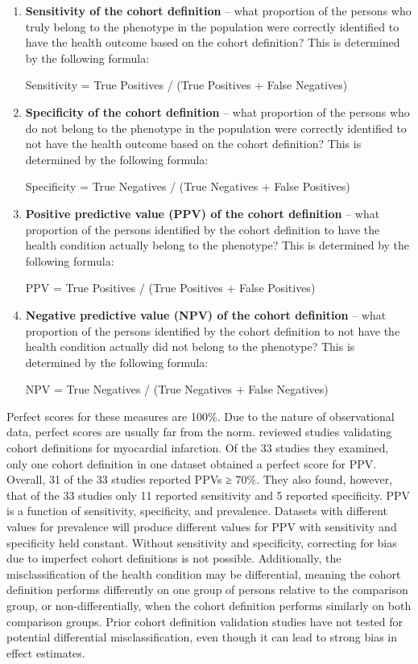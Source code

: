 \documentclass[11pt]{book}
\theoremstyle{definition}
\theoremstyle{definition}
\theoremstyle{definition}
\theoremstyle{remark}
\begin{document}
\begin{enumerate}
\def\labelenumi{\arabic{enumi}.}
\item
  \textbf{Sensitivity of the cohort definition} -- what proportion of
  the persons who truly belong to the phenotype in the population were
  correctly identified to have the health outcome based on the cohort
  definition? This is determined by the following formula:

  Sensitivity = True Positives / (True Positives + False Negatives)
\item
  \textbf{Specificity of the cohort definition} -- what proportion of
  the persons who do not belong to the phenotype in the population were
  correctly identified to not have the health outcome based on the
  cohort definition? This is determined by the following formula:

  Specificity = True Negatives / (True Negatives + False Positives)
\item
  \textbf{Positive predictive value (PPV) of the cohort definition} --
  what proportion of the persons identified by the cohort definition to
  have the health condition actually belong to the phenotype? This is
  determined by the following formula:

  PPV = True Positives / (True Positives + False Positives)
\item
  \textbf{Negative predictive value (NPV) of the cohort definition} --
  what proportion of the persons identified by the cohort definition to
  not have the health condition actually did not belong to the
  phenotype? This is determined by the following formula:

  NPV = True Negatives / (True Negatives + False Negatives)
\end{enumerate}

Perfect scores for these measures are 100\%. Due to the nature of
observational data, perfect scores are usually far from the norm.
\citet{Rubbo2015phenotypes} reviewed studies validating cohort
definitions for myocardial infarction. Of the 33 studies they examined,
only one cohort definition in one dataset obtained a perfect score for
PPV. Overall, 31 of the 33 studies reported PPVs ≥ 70\%. They also
found, however, that of the 33 studies only 11 reported sensitivity and
5 reported specificity. PPV is a function of sensitivity, specificity,
and prevalence. Datasets with different values for prevalence will
produce different values for PPV with sensitivity and specificity held
constant. Without sensitivity and specificity, correcting for bias due
to imperfect cohort definitions is not possible. Additionally, the
misclassification of the health condition may be differential, meaning
the cohort definition performs differently on one group of persons
relative to the comparison group, or non-differentially, when the cohort
definition performs similarly on both comparison groups. Prior cohort
definition validation studies have not tested for potential differential
misclassification, even though it can lead to strong bias in effect
estimates.
\end{document}
